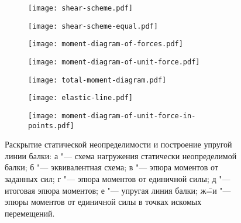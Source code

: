 \begin{figure}[!ht]
    \centering
    \begin{subfigure}[b]{0.4\textwidth}
        \centering
        \texttt{[image: shear-scheme.pdf]}
        \caption{}
        \label{fig:shear-scheme}
    \end{subfigure}
    \hspace{0.1\textwidth}
    \begin{subfigure}[b]{0.4\textwidth}
        \centering
        \texttt{[image: shear-scheme-equal.pdf]}
        \caption{}
        \label{fig:shear-scheme-equal}
    \end{subfigure}
    \hspace{0.1\textwidth}
    \begin{subfigure}[b]{0.4\textwidth}
        \centering
        \texttt{[image: moment-diagram-of-forces.pdf]}
        \caption{}
        \label{fig:moment-diagram-of-forces}
    \end{subfigure}
    \hspace{0.1\textwidth}
    \begin{subfigure}[b]{0.4\textwidth}
        \centering
        \texttt{[image: moment-diagram-of-unit-force.pdf]}
        \caption{}
        \label{fig:moment-diagram-of-unit-force}
    \end{subfigure}
    \hspace{0.1\textwidth}
    \begin{subfigure}[b]{0.4\textwidth}
        \centering
        \texttt{[image: total-moment-diagram.pdf]}
        \caption{}
        \label{fig:total-moment-diagram}
    \end{subfigure}
    \hspace{0.1\textwidth}
    \begin{subfigure}[b]{0.4\textwidth}
        \centering
        \texttt{[image: elastic-line.pdf]}
        \caption{}
        \label{fig:elastic-line}
    \end{subfigure}
    \hspace{0.1\textwidth}
    \begin{subfigure}[b]{0.4\textwidth}
        \centering
        \texttt{[image: moment-diagram-of-unit-force-in-points.pdf]}
        \caption{}
        \label{fig:moment-diagram-of-unit-force-in-points}
    \end{subfigure}
    \hspace{0.1\textwidth}
    \caption{Раскрытие статической неопределимости и построение упругой линии балки:
    а "--- схема нагружения статически неопределимой балки;
    б "--- эквивалентная схема;
    в "--- эпюра моментов от заданных сил;
    г "--- эпюра моментов от единичной силы;
    д "--- итоговая эпюра моментов;
    е "--- упругая линия балки;
    ж\==и "--- эпюры моментов от единичной силы в точках искомых перемещений.}
    \label{fig:moment-diagrams-and-elastic-line}
\end{figure}


